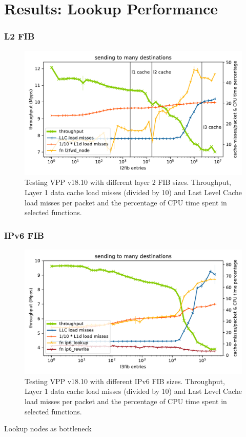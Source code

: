 \section{Results: Lookup Performance}

\begin{frame}
    \frametitle{L2 FIB}
    \begin{figure}[!ht]
    \noindent\hspace{0.5mm}\includegraphics[width=\linewidth]{pics/throughput_l2_throughmac_klaipeda32ghz_v3.pdf}
    \caption{Testing VPP v18.10 with different layer 2 FIB sizes. Throughput, Layer 1 data cache load misses (divided by 10) and Last Level Cache load misses per packet and the percentage of CPU time spent in selected functions. }
    \label{graph:l2fib}
    \end{figure}
\end{frame}

\begin{frame}
    \frametitle{IPv6 FIB}
    \begin{figure}[!ht]
    \noindent\hspace{0.5mm}\includegraphics[width=\linewidth]{pics/throughput_l3v6_routes_klaipeda32ghz_v3.pdf}
    \caption{Testing VPP v18.10 with different IPv6 FIB sizes. Throughput, Layer 1 data cache load misses (divided by 10) and Last Level Cache load misses per packet and the percentage of CPU time spent in selected functions. }
    \label{graph:ip6fib}
    \end{figure}
    Lookup nodes as bottleneck
\end{frame}


